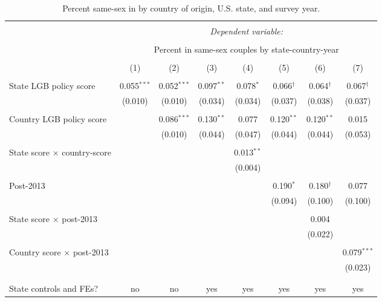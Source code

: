 \documentclass[
  11pt,
]{article}
\begin{document}
\begin{table}[!htbp] \centering 
  \caption{Percent same-sex in by country of origin, U.S. state, and survey year.} 
  \label{tab:state-props} 
\begin{tabular}{@{\extracolsep{5pt}}lccccccc} 
\\[-1.8ex]\hline 
\hline \\[-1.8ex] 
 & \multicolumn{7}{c}{\textit{Dependent variable:}} \\ 
\cline{2-8} 
\\[-1.8ex] & \multicolumn{7}{c}{Percent in same-sex couples by state-country-year} \\ 
\\[-1.8ex] & (1) & (2) & (3) & (4) & (5) & (6) & (7)\\ 
\hline \\[-1.8ex] 
 State LGB policy score & 0.055$^{***}$ & 0.052$^{***}$ & 0.097$^{**}$ & 0.078$^{*}$ & 0.066$^{†}$ & 0.064$^{†}$ & 0.067$^{†}$ \\ 
  & (0.010) & (0.010) & (0.034) & (0.034) & (0.037) & (0.038) & (0.037) \\ 
  & & & & & & & \\ 
 Country LGB policy score &  & 0.086$^{***}$ & 0.130$^{**}$ & 0.077 & 0.120$^{**}$ & 0.120$^{**}$ & 0.015 \\ 
  &  & (0.010) & (0.044) & (0.047) & (0.044) & (0.044) & (0.053) \\ 
  & & & & & & & \\ 
 State score × country-score &  &  &  & 0.013$^{**}$ &  &  &  \\ 
  &  &  &  & (0.004) &  &  &  \\ 
  & & & & & & & \\ 
 Post-2013 &  &  &  &  & 0.190$^{*}$ & 0.180$^{†}$ & 0.077 \\ 
  &  &  &  &  & (0.094) & (0.100) & (0.100) \\ 
  & & & & & & & \\ 
 State score × post-2013 &  &  &  &  &  & 0.004 &  \\ 
  &  &  &  &  &  & (0.022) &  \\ 
  & & & & & & & \\ 
 Country score × post-2013 &  &  &  &  &  &  & 0.079$^{***}$ \\ 
  &  &  &  &  &  &  & (0.023) \\ 
  & & & & & & & \\ 
\hline \\[-1.8ex] 
State controls and FEs? & no & no & yes & yes & yes & yes & yes \\ 

\end{tabular}
\end{table}
\end{document}
